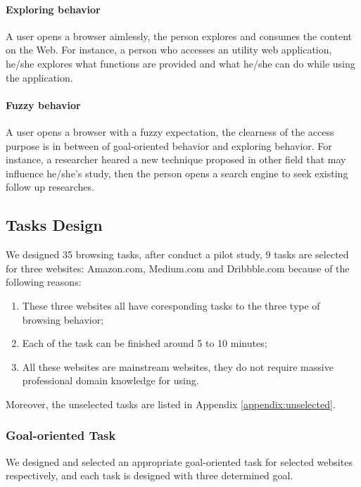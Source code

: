 \paragraph{Exploring behavior} A user opens a browser aimlessly, the person explores and consumes the content
on the Web. For instance, a person who accesses an utility web application, he/she explores
what functions are provided and what he/she can do while using the application.

\paragraph{Fuzzy behavior} A user opens a browser with a fuzzy expectation, the clearness of the access purpose
is in between of goal-oriented behavior and exploring behavior.
For instance, a researcher heared a new technique proposed in other field that may influence he/she's study, 
then the person opens a search engine to seek existing follow up researches.


\subsection{Tasks Design}
\label{sec:task-design}

We designed 35 browsing tasks, after conduct a pilot study, 
9 tasks are selected for three websites: Amazon.com, Medium.com and Dribbble.com 
because of the following reasons:

\begin{enumerate}
    \item These three websites all have coresponding tasks to the three type of browsing behavior;
    \item Each of the task can be finished around 5 to 10 minutes;
    \item All these websites are mainstream websites, they do not require 
        massive professional domain knowledge for using.
\end{enumerate}

Moreover, the unselected tasks are listed in Appendix \ref{appendix:unselected}.

\subsubsection{Goal-oriented Task}

We designed and selected an appropriate goal-oriented task for selected websites respectively,
and each task is designed with three determined goal.

